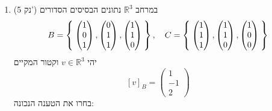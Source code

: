 \documentclass[12pt, a4paper]{article}
\newcommand{\rr}{\mathbb{R}}
\newcommand{\points}[1]{(#1 נק') }
\begin{document}
\begin{enumerate}
\item\points{5}
במרחב
$\rr^3$
נתונים הבסיסים הסדורים
$$B=\Set{\begin{pmatrix}
    1 \\ 0 \\1
\end{pmatrix},
\begin{pmatrix}
    0 \\ 1 \\1
\end{pmatrix},
\begin{pmatrix}
    1 \\ 1\\0
\end{pmatrix}},\quad  C=\Set{\begin{pmatrix}
    1 \\ 1 \\1
\end{pmatrix},
\begin{pmatrix}
    1 \\ 1 \\0
\end{pmatrix},
\begin{pmatrix}
    1 \\ 0 \\0
\end{pmatrix}}$$
יהי
$v\in\rr^3$
וקטור המקיים
$$[v]_B=
\begin{pmatrix}
1\\
-1\\
2
\end{pmatrix}$$
בחרו את הטענה הנכונה:
\begin{enumerate}
\end{enumerate}
\end{enumerate}
\end{document}
